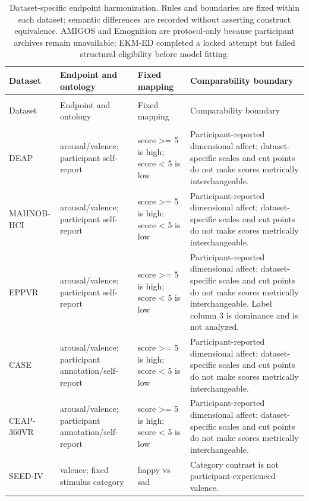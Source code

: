 \begin{longtable}{@{}>{\raggedright\arraybackslash}p{2.65cm}>{\raggedright\arraybackslash}p{2.85cm}>{\raggedright\arraybackslash}p{3.20cm}>{\raggedright\arraybackslash}p{\dimexpr\textwidth-8.70cm-6\tabcolsep\relax}@{}}
\caption{Dataset-specific endpoint harmonization. Rules and boundaries are fixed within each dataset; semantic differences are recorded without asserting construct equivalence. AMIGOS and Emognition are protocol-only because participant archives remain unavailable; EKM-ED completed a locked attempt but failed structural eligibility before model fitting.}\label{tab:endpoint-harmonization}\\
\toprule
Dataset & Endpoint and ontology & Fixed mapping & Comparability boundary \\
\midrule
\endfirsthead
\multicolumn{4}{@{}l}{\tablename\ \thetable\ continued}\\
\toprule
Dataset & Endpoint and ontology & Fixed mapping & Comparability boundary \\
\midrule
\endhead
\midrule
\multicolumn{4}{r@{}}{Continued on next page}\\
\endfoot
\bottomrule
\endlastfoot
DEAP & arousal/valence; participant self-report & score >= 5 is high; score < 5 is low & Participant-reported dimensional affect; dataset-specific scales and cut points do not make scores metrically interchangeable. \\
MAHNOB-HCI & arousal/valence; participant self-report & score >= 5 is high; score < 5 is low & Participant-reported dimensional affect; dataset-specific scales and cut points do not make scores metrically interchangeable. \\
EPPVR & arousal/valence; participant self-report & score >= 5 is high; score < 5 is low & Participant-reported dimensional affect; dataset-specific scales and cut points do not make scores metrically interchangeable. Label column 3 is dominance and is not analyzed. \\
CASE & arousal/valence; participant annotation/self-report & score >= 5 is high; score < 5 is low & Participant-reported dimensional affect; dataset-specific scales and cut points do not make scores metrically interchangeable. \\
CEAP-360VR & arousal/valence; participant annotation/self-report & score >= 5 is high; score < 5 is low & Participant-reported dimensional affect; dataset-specific scales and cut points do not make scores metrically interchangeable. \\
SEED-IV & valence; fixed stimulus category & happy vs sad & Category contrast is not participant-experienced valence. \\

\end{longtable}
